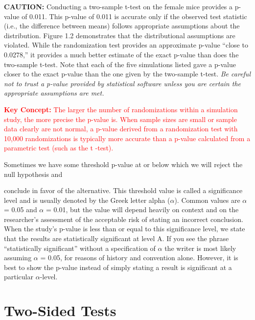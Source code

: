 \documentclass[
]{report}
\theoremstyle{definition}
\theoremstyle{definition}
\theoremstyle{definition}
\theoremstyle{definition}
\theoremstyle{remark}
\begin{document}
\textbf{CAUTION:}
Conducting a two-sample t-test on the female mice provides a p-value of 0.011. This p-value of 0.011 is
accurate only if the observed test statistic (i.e., the difference between means) follows appropriate assumptions
about the distribution. Figure 1.2 demonstrates that the distributional assumptions are violated. While
the randomization test provides an approximate p-value ``close to 0.0278,'' it provides a much better estimate
of the exact p-value than does the two-sample t-test. Note that each of the five simulations listed gave a
p-value closer to the exact p-value than the one given by the two-sample t-test. \textit{Be careful not to trust a
p-value provided by statistical software unless you are certain the appropriate assumptions are met.}

\Large

\textbf{\textcolor{red}{Key Concept:}}
\textcolor{red}{The larger the number of randomizations within a simulation study, the more precise the p-value is.
When sample sizes are small or sample data clearly are not normal, a p-value derived from a randomization
test with 10,000 randomizations is typically more accurate than a p-value calculated from
a parametric test (such as the t -test).}

\normalsize

Sometimes we have some threshold p-value at or below which we will reject the null hypothesis and

conclude in favor of the alternative. This threshold value is called a significance level and is usually denoted
by the Greek letter alpha (\(\alpha\)). Common values are \(\alpha\) = 0.05 and \(\alpha\) = 0.01, but the value will depend heavily
on context and on the researcher's assessment of the acceptable risk of stating an incorrect conclusion. When
the study's p-value is less than or equal to this significance level, we state that the results are statistically
significant at level A. If you see the phrase ``statistically significant'' without a specification of \(\alpha\) the writer
is most likely assuming \(\alpha\) = 0.05, for reasons of history and convention alone. However, it is best to show
the p-value instead of simply stating a result is significant at a particular \(\alpha\)-level.

\hypertarget{two-sided-tests}{%
\section{\texorpdfstring{\textbf{Two-Sided Tests}}{Two-Sided Tests}}\label{two-sided-tests}}
\end{document}
